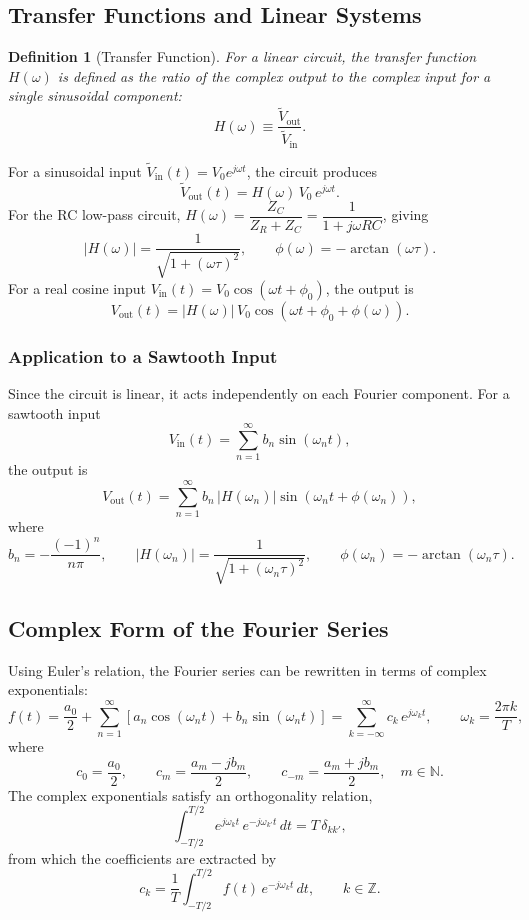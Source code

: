 \documentclass{article}
\newtheorem{definition}{Definition}
\begin{document}
\subsection{Transfer Functions and Linear Systems}

\begin{definition}[Transfer Function]
    For a linear circuit, the transfer function $H(\omega)$ is defined as the ratio of the complex output to the complex input for a single sinusoidal component:
    \[H(\omega) \equiv \frac{\tilde{V}_{\text{out}}}{\tilde{V}_{\text{in}}}.\]
\end{definition}

For a sinusoidal input $\tilde{V}_{\text{in}}(t) = V_0 e^{j\omega t}$, the circuit produces
\[\tilde{V}_{\text{out}}(t) = H(\omega)\,V_0\,e^{j\omega t}.\]
For the RC low-pass circuit, $H(\omega) = \dfrac{Z_C}{Z_R + Z_C} = \dfrac{1}{1 + j\omega RC}$, giving
\[|H(\omega)| = \frac{1}{\sqrt{1 + (\omega\tau)^2}}, \qquad \phi(\omega) = -\arctan(\omega\tau).\]
For a real cosine input $V_{\text{in}}(t) = V_0\cos(\omega t + \phi_0)$, the output is
\[V_{\text{out}}(t) = |H(\omega)|\,V_0\cos\!\left(\omega t + \phi_0 + \phi(\omega)\right).\]

\subsubsection{Application to a Sawtooth Input}

Since the circuit is linear, it acts independently on each Fourier component. For a sawtooth input
\[V_{\text{in}}(t) = \sum_{n=1}^{\infty} b_n \sin(\omega_n t),\]
the output is
\[V_{\text{out}}(t) = \sum_{n=1}^{\infty} b_n\,|H(\omega_n)|\sin\!\left(\omega_n t + \phi(\omega_n)\right),\]
where
\[b_n = -\frac{(-1)^n}{n\pi}, \qquad |H(\omega_n)| = \frac{1}{\sqrt{1 + (\omega_n\tau)^2}}, \qquad \phi(\omega_n) = -\arctan(\omega_n\tau).\]

\subsection{Complex Form of the Fourier Series}

Using Euler's relation, the Fourier series can be rewritten in terms of complex exponentials:
\[f(t) = \frac{a_0}{2} + \sum_{n=1}^{\infty}\left[a_n\cos(\omega_n t) + b_n\sin(\omega_n t)\right] = \sum_{k=-\infty}^{\infty} c_k\,e^{j\omega_k t}, \qquad \omega_k = \frac{2\pi k}{T},\]
where
\[c_0 = \frac{a_0}{2}, \qquad c_m = \frac{a_m - jb_m}{2}, \qquad c_{-m} = \frac{a_m + jb_m}{2}, \quad m \in \mathbb{N}.\]
The complex exponentials satisfy an orthogonality relation,
\[\int_{-T/2}^{T/2} e^{j\omega_k t}\,e^{-j\omega_{k'} t}\,dt = T\,\delta_{kk'},\]
from which the coefficients are extracted by
\[c_k = \frac{1}{T}\int_{-T/2}^{T/2} f(t)\,e^{-j\omega_k t}\,dt, \qquad k \in \mathbb{Z}.\]
\end{document}
